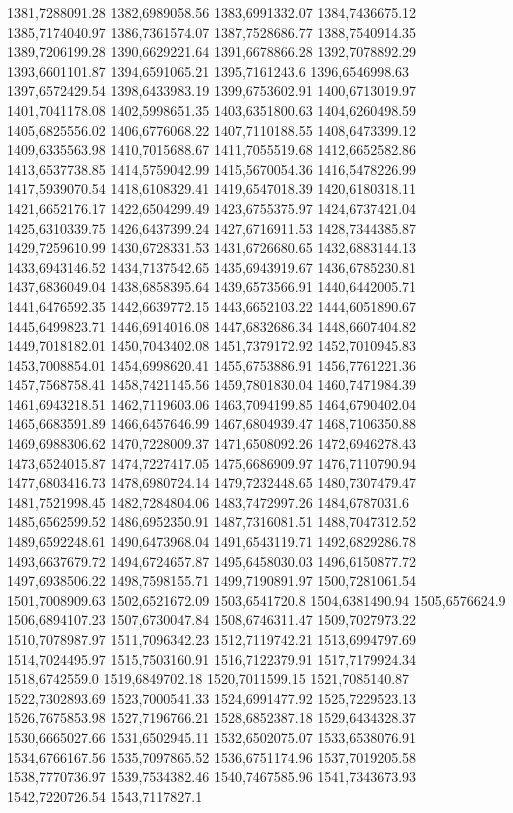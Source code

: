 1381,7288091.28
1382,6989058.56
1383,6991332.07
1384,7436675.12
1385,7174040.97
1386,7361574.07
1387,7528686.77
1388,7540914.35
1389,7206199.28
1390,6629221.64
1391,6678866.28
1392,7078892.29
1393,6601101.87
1394,6591065.21
1395,7161243.6
1396,6546998.63
1397,6572429.54
1398,6433983.19
1399,6753602.91
1400,6713019.97
1401,7041178.08
1402,5998651.35
1403,6351800.63
1404,6260498.59
1405,6825556.02
1406,6776068.22
1407,7110188.55
1408,6473399.12
1409,6335563.98
1410,7015688.67
1411,7055519.68
1412,6652582.86
1413,6537738.85
1414,5759042.99
1415,5670054.36
1416,5478226.99
1417,5939070.54
1418,6108329.41
1419,6547018.39
1420,6180318.11
1421,6652176.17
1422,6504299.49
1423,6755375.97
1424,6737421.04
1425,6310339.75
1426,6437399.24
1427,6716911.53
1428,7344385.87
1429,7259610.99
1430,6728331.53
1431,6726680.65
1432,6883144.13
1433,6943146.52
1434,7137542.65
1435,6943919.67
1436,6785230.81
1437,6836049.04
1438,6858395.64
1439,6573566.91
1440,6442005.71
1441,6476592.35
1442,6639772.15
1443,6652103.22
1444,6051890.67
1445,6499823.71
1446,6914016.08
1447,6832686.34
1448,6607404.82
1449,7018182.01
1450,7043402.08
1451,7379172.92
1452,7010945.83
1453,7008854.01
1454,6998620.41
1455,6753886.91
1456,7761221.36
1457,7568758.41
1458,7421145.56
1459,7801830.04
1460,7471984.39
1461,6943218.51
1462,7119603.06
1463,7094199.85
1464,6790402.04
1465,6683591.89
1466,6457646.99
1467,6804939.47
1468,7106350.88
1469,6988306.62
1470,7228009.37
1471,6508092.26
1472,6946278.43
1473,6524015.87
1474,7227417.05
1475,6686909.97
1476,7110790.94
1477,6803416.73
1478,6980724.14
1479,7232448.65
1480,7307479.47
1481,7521998.45
1482,7284804.06
1483,7472997.26
1484,6787031.6
1485,6562599.52
1486,6952350.91
1487,7316081.51
1488,7047312.52
1489,6592248.61
1490,6473968.04
1491,6543119.71
1492,6829286.78
1493,6637679.72
1494,6724657.87
1495,6458030.03
1496,6150877.72
1497,6938506.22
1498,7598155.71
1499,7190891.97
1500,7281061.54
1501,7008909.63
1502,6521672.09
1503,6541720.8
1504,6381490.94
1505,6576624.9
1506,6894107.23
1507,6730047.84
1508,6746311.47
1509,7027973.22
1510,7078987.97
1511,7096342.23
1512,7119742.21
1513,6994797.69
1514,7024495.97
1515,7503160.91
1516,7122379.91
1517,7179924.34
1518,6742559.0
1519,6849702.18
1520,7011599.15
1521,7085140.87
1522,7302893.69
1523,7000541.33
1524,6991477.92
1525,7229523.13
1526,7675853.98
1527,7196766.21
1528,6852387.18
1529,6434328.37
1530,6665027.66
1531,6502945.11
1532,6502075.07
1533,6538076.91
1534,6766167.56
1535,7097865.52
1536,6751174.96
1537,7019205.58
1538,7770736.97
1539,7534382.46
1540,7467585.96
1541,7343673.93
1542,7220726.54
1543,7117827.1
